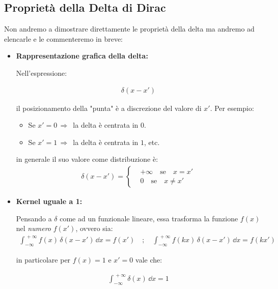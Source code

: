 \subsection{Proprietà della Delta di Dirac}
	
	Non andremo a dimostrare direttamente le proprietà della delta ma andremo ad elencarle e le commenteremo in breve:
	
\begin{itemize}

	\item \textbf{Rappresentazione grafica della delta:}
	
		Nell'espressione:
		
	\begin{align*}
		\delta(x-x')
	\end{align*}
		
		il posizionamento della "punta" è a discrezione del valore di $x'$. Per esempio:
	\begin{itemize}
		\item Se $x' = 0 \, \Rightarrow \, $ la delta è centrata in $0$. 
		\item Se $x' = 1 \, \Rightarrow \, $ la delta è centrata in $1$, etc.
	\end{itemize}
		
		in generale il suo valore come distribuzione è:	
	\begin{align*}
	\delta(x-x') = \begin{cases}
		&+\infty \quad \text{se} \quad x = x' \\
		&0 \quad \text{se} \quad x \neq x'
		\end{cases}
	\end{align*}

	\item \textbf{Kernel uguale a 1:}
		
		Pensando a $\delta$ come ad un funzionale lineare, essa trasforma la funzione $f(x)$ nel \textit{numero} $f(x')$, ovvero sia:
	\begin{align*}
		\int_{-\infty}^{\, +\infty} f(x) \, \delta(x-x') \, \dd x = f(x') \quad ; \quad \int_{-\infty}^{\, +\infty} f(kx) \, \delta(x-x') \, \dd x = f(kx') 
	\end{align*}
	
		in particolare per $f(x) = 1$ e $x' = 0$ vale che:
		
	\begin{align*}
		\int_{-\infty}^{\, +\infty} \delta(x) \, \dd x = 1
	\end{align*}
	
\end{itemize}

